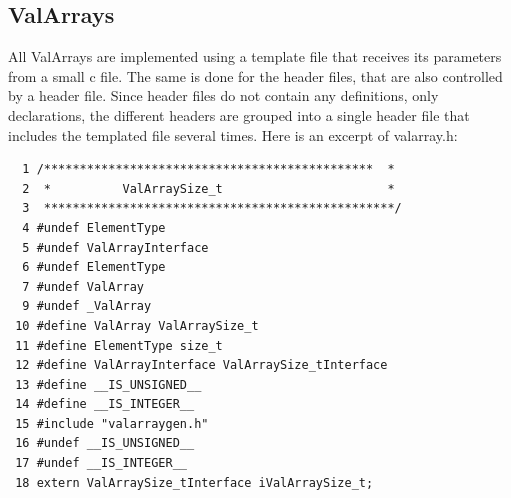 \documentclass[12pt,a4paper]{memoir} %
\begin{document}
{{\subsection{ValArrays}
All ValArrays are implemented using a template file that receives its parameters from a small c file. The same is done for the header files, that
are also controlled by a header file. Since header files do not contain any definitions, only declarations, the different headers are grouped into
a single header file that includes the templated file several times. Here is an excerpt of valarray.h:
\begin{verbatim}
  1 /**********************************************  *       
  2  *          ValArraySize_t                       *
  3  *************************************************/ 
  4 #undef ElementType
  5 #undef ValArrayInterface
  6 #undef ElementType
  7 #undef ValArray
  9 #undef _ValArray
 10 #define ValArray ValArraySize_t
 11 #define ElementType size_t
 12 #define ValArrayInterface ValArraySize_tInterface
 13 #define __IS_UNSIGNED__
 14 #define __IS_INTEGER__
 15 #include "valarraygen.h"
 16 #undef __IS_UNSIGNED__
 17 #undef __IS_INTEGER__
 18 extern ValArraySize_tInterface iValArraySize_t;
 

\end{verbatim}}}
\end{document}
